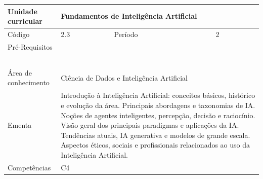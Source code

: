 \clearpage
\newpage

\begin{quadro}[ht!]
  \centering\scriptsize
\caption{Unidade Curricular Fundamentos de Inteligência Artificial}

\begin{tabular}{|p{2.5cm}|p{2.5cm}|p{2.5cm}|p{2.5cm}|p{2.5cm}|}\hline

  Unidade curricular & \multicolumn{4}{p{10cm}|}{ Fundamentos de Inteligência Artificial }\\\hline
  Código & 2.3 & Período & \multicolumn{2}{p{5cm}|}{ 2 }\\\hline
  Pré-Requisitos & \multicolumn{4}{p{10cm}|}{  } \\\hline
  \cellcolor{blue1}{ CH PRESENCIAL } &
    \cellcolor{blue1}{CH EAD Síncrona} &
    \cellcolor{blue1}{CH EAD Síncrona Mediada} &
    \cellcolor{blue1}{CH EAD Assíncrona} &
    \cellcolor{blue1}{CH APCC} \\\hline
  \cellcolor{blue1}{ 45 } &
    \cellcolor{blue1}{ 0 } &
    \cellcolor{blue1}{ 0 } &
    \cellcolor{blue1}{ 15 } &
    \cellcolor{blue1}{0} \\\hline
  \cellcolor{blue1}{ CH Teórica } &
    \cellcolor{blue1}{CH Prática} &
    \cellcolor{blue1}{CH Humanidades} &
    \cellcolor{blue1}{CH Extensão} &
    \cellcolor{blue1}{CH EAD TOTAL} \\\hline
  \cellcolor{blue1}{ 30 } &
    \cellcolor{blue1}{ 30 } &
    \cellcolor{blue1}{ 0 } &
    \cellcolor{blue1}{ 0 } &
    \cellcolor{blue1}{ 15 } \\\hline
  \cellcolor{blue1}{CARGA-HORÁRIA TOTAL} & \multicolumn{4}{p{10cm}|}{ \cellcolor{blue1}{ 60 } } \\\hline
  Área de conhecimento & \multicolumn{4}{p{10cm}|}{ Ciência de Dados e Inteligência Artificial } \\\hline
  Ementa & \multicolumn{4}{p{10cm}|}{ Introdução à Inteligência Artificial: conceitos básicos, histórico e evolução da área. Principais abordagens e taxonomias de IA. Noções de agentes inteligentes, percepção, decisão e raciocínio. Visão geral dos principais paradigmas e aplicações da IA. Tendências atuais, IA generativa e modelos de grande escala. Aspectos éticos, sociais e profissionais relacionados ao uso da Inteligência Artificial. } \\\hline
  Competências & \multicolumn{4}{p{10cm}|}{ C4 } \\\hline


  
	\end{tabular}

\end{quadro}


